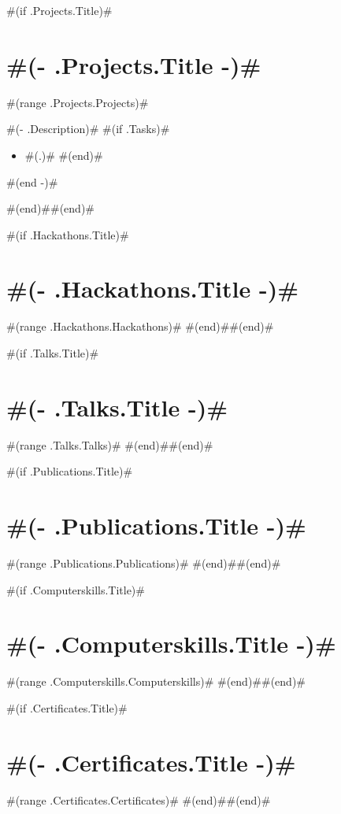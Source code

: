 \documentclass[10pt,a4paper,sans]{moderncv}
\begin{document}
#(if .Projects.Title)#\section{ #(- .Projects.Title -)# }
#(range .Projects.Projects)#
{ #(- .Description)# 
  #(if .Tasks)#\begin{itemize}
    #(range .Tasks)# \item #(.)#
    #(end)#\end{itemize}
  #(end -)# }
#(end)##(end)#

#(if .Hackathons.Title)#\section{ #(- .Hackathons.Title -)# }
#(range .Hackathons.Hackathons)#
#(end)##(end)#

#(if .Talks.Title)#\section{ #(- .Talks.Title -)#  }
#(range .Talks.Talks)#
#(end)##(end)#

#(if .Publications.Title)#\section{ #(- .Publications.Title -)#  }
#(range .Publications.Publications)#
#(end)##(end)#

#(if .Computerskills.Title)#\section{ #(- .Computerskills.Title -)#  }
#(range .Computerskills.Computerskills)#
#(end)##(end)#

#(if .Certificates.Title)#\section{ #(- .Certificates.Title -)# }
#(range .Certificates.Certificates)#
#(end)##(end)#
\end{document}
